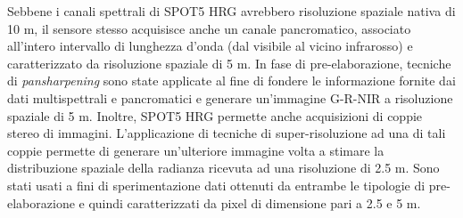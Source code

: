Sebbene i canali spettrali di SPOT5 HRG avrebbero risoluzione spaziale nativa di 10 m, il sensore stesso acquisisce anche un canale pancromatico, associato all'intero intervallo di lunghezza d'onda (dal visibile al vicino infrarosso) e caratterizzato da risoluzione spaziale di 5 m. In fase di pre-elaborazione, tecniche di \emph{pansharpening} sono state applicate al fine di fondere le informazione fornite dai dati multispettrali e pancromatici e generare un'immagine G-R-NIR a risoluzione spaziale di 5 m. Inoltre, SPOT5 HRG permette anche acquisizioni di coppie stereo di immagini. L'applicazione di tecniche di super-risoluzione ad una di tali coppie permette di generare un'ulteriore immagine volta a stimare la distribuzione spaziale della radianza ricevuta ad una risoluzione di 2.5 m. Sono stati usati a fini di sperimentazione dati ottenuti da entrambe le tipologie di pre-elaborazione e quindi caratterizzati da pixel di dimensione pari a 2.5 e 5 m.
 

